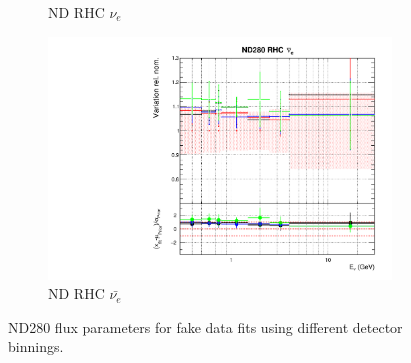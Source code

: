 \begin{figure}[!htbp]
\begin{subfigure}{0.45\textwidth}
  \caption{ND RHC $\nu_e$}
\end{subfigure}
\begin{subfigure}{0.45\textwidth}
  \centering
  \includegraphics[width=0.75\linewidth]{figs/detcovbinflux_7}
  \caption{ND RHC $\bar{\nu_e}$}
\end{subfigure}
\caption{ND280 flux parameters for fake data fits using different detector binnings.}
\label{fig:detcovbinfluxND}
\end{figure}

